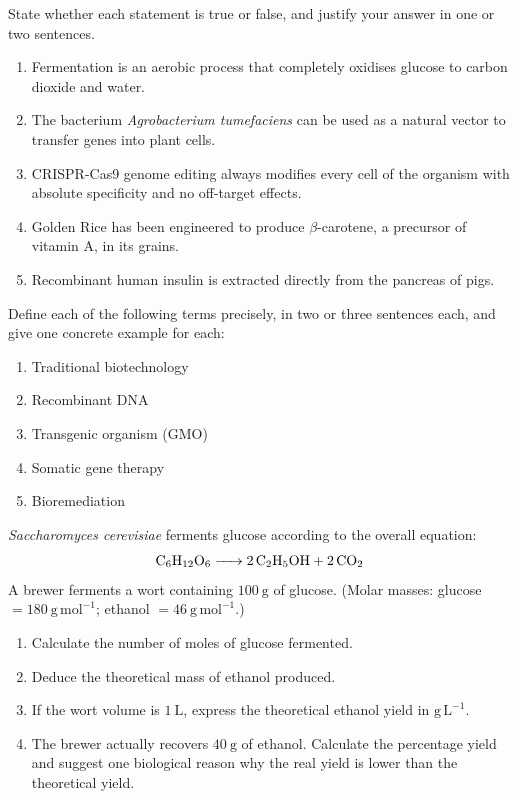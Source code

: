 \documentclass[11pt]{article}
\begin{document}
\begin{exercice}
State whether each statement is true or false, and justify your answer in one or two sentences.
\begin{enumerate}
\item Fermentation is an aerobic process that completely oxidises glucose to carbon dioxide and water.
\item The bacterium \emph{Agrobacterium tumefaciens} can be used as a natural vector to transfer genes into plant cells.
\item CRISPR-Cas9 genome editing always modifies every cell of the organism with absolute specificity and no off-target effects.
\item Golden Rice has been engineered to produce $\beta$-carotene, a precursor of vitamin A, in its grains.
\item Recombinant human insulin is extracted directly from the pancreas of pigs.
\end{enumerate}
\end{exercice}

\begin{exercice}
Define each of the following terms precisely, in two or three sentences each, and give one concrete example for each:
\begin{enumerate}
\item Traditional biotechnology
\item Recombinant DNA
\item Transgenic organism (GMO)
\item Somatic gene therapy
\item Bioremediation
\end{enumerate}
\end{exercice}

\begin{exercice}
\emph{Saccharomyces cerevisiae} ferments glucose according to the overall equation:
\[ \ce{C6H12O6 -> 2 C2H5OH + 2 CO2} \]
A brewer ferments a wort containing $100\ \mathrm{g}$ of glucose. (Molar masses: glucose $= 180\ \mathrm{g\,mol^{-1}}$; ethanol $= 46\ \mathrm{g\,mol^{-1}}$.)
\begin{enumerate}
\item Calculate the number of moles of glucose fermented.
\item Deduce the theoretical mass of ethanol produced.
\item If the wort volume is $1\ \mathrm{L}$, express the theoretical ethanol yield in $\mathrm{g\,L^{-1}}$.
\item The brewer actually recovers $40\ \mathrm{g}$ of ethanol. Calculate the percentage yield and suggest one biological reason why the real yield is lower than the theoretical yield.
\end{enumerate}
\end{exercice}
\end{document}
